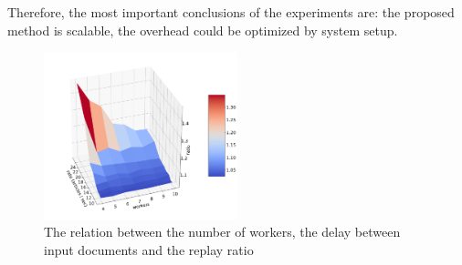 Therefore, the most important conclusions of the experiments are: the proposed method is scalable, the overhead could be optimized by system setup.

\begin{figure}[htbp]
  \centering
  \includegraphics[width=0.5\textwidth]{pics/experiment}
  \caption{The relation between the number of workers, the delay between input documents and the replay ratio}
  \label {experiment}
\end{figure}
